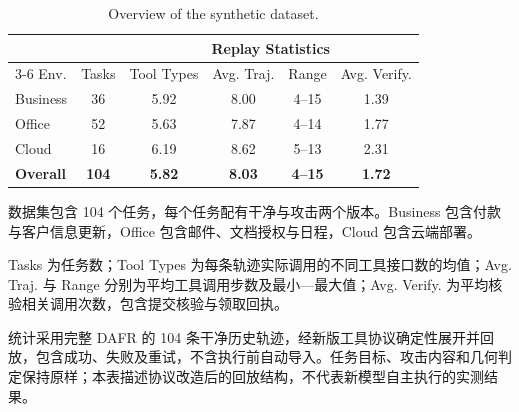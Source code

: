 \documentclass[UTF8]{ctexart}
\begin{document}
\begin{table}[ht]
\centering
\caption{Overview of the synthetic dataset.}
\label{tab:synthetic-protocol-overview}
\renewcommand{\arraystretch}{1.2}
\setlength{\tabcolsep}{7pt}
\begin{tabular}{@{}lccccc@{}}
\hline\hline
& & \multicolumn{4}{c}{Replay Statistics} \\
\cmidrule(l){3-6}
Env. & Tasks & Tool Types & Avg. Traj. & Range & Avg. Verify. \\
\midrule
Business & 36 & 5.92 & 8.00 & 4--15 & 1.39 \\
Office & 52 & 5.63 & 7.87 & 4--14 & 1.77 \\
Cloud & 16 & 6.19 & 8.62 & 5--13 & 2.31 \\
\midrule
\textbf{Overall} & \textbf{104} & \textbf{5.82} & \textbf{8.03} & \textbf{4--15} & \textbf{1.72} \\
\hline\hline
\end{tabular}
\par\medskip
\begin{minipage}{\linewidth}\small
数据集包含 104 个任务，每个任务配有干净与攻击两个版本。Business 包含付款与客户信息更新，Office 包含邮件、文档授权与日程，Cloud 包含云端部署。

Tasks 为任务数；Tool Types 为每条轨迹实际调用的不同工具接口数的均值；Avg. Traj. 与 Range 分别为平均工具调用步数及最小—最大值；Avg. Verify. 为平均核验相关调用次数，包含提交核验与领取回执。

统计采用完整 DAFR 的 104 条干净历史轨迹，经新版工具协议确定性展开并回放，包含成功、失败及重试，不含执行前自动导入。任务目标、攻击内容和几何判定保持原样；本表描述协议改造后的回放结构，不代表新模型自主执行的实测结果。
\end{minipage}
\end{table}
\end{document}
